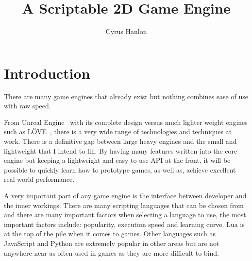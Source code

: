 \documentclass[11pt,a4paper,titlepage]{report}
\author{Cyrus Hanlon}
\title{A Scriptable 2D Game Engine}
\begin{document}
	\maketitle
	

	\tableofcontents{}
	\newpage

\chapter{Introduction}
		

	There are many game engines that already exist but nothing combines ease of use with raw speed.
	
	From Unreal Engine~\cite{UE} with its complete design versus much lighter weight engines such as LÖVE~\cite{LOVE}, there is a very wide range of technologies and techniques at work. There is a definitive gap between large heavy engines and the small and lightweight that I intend to fill. By having many features written into the core engine but keeping a lightweight and easy to use API at the front, it will be possible to quickly learn how to prototype games, as well as, achieve excellent real world performance.

	A very important part of any game engine is the interface between developer and the inner workings. There are many scripting languages that can be chosen from and there are many important factors when selecting a language to use, the most important factors include: popularity, execution speed and learning curve. Lua is at the top of the pile when it comes to games. Other languages such as JavaScript and Python are extremely popular in other areas but are not anywhere near as often used in games as they are more difficult to bind.
				
\end{document}
